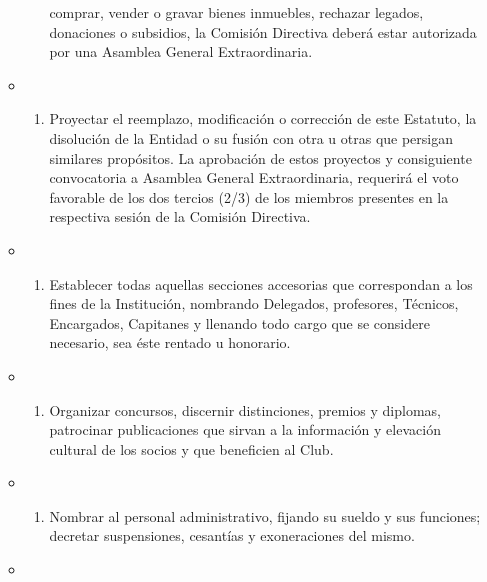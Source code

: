 \documentclass[]{book}
\providecommand{\tightlist}{%
  \setlength{\itemsep}{0pt}\setlength{\parskip}{0pt}}
\begin{document}
\begin{itemize}
\begin{itemize}
\begin{enumerate}
      comprar, vender o gravar bienes inmuebles, rechazar legados,
      donaciones o subsidios, la Comisión Directiva deberá estar
      autorizada por una Asamblea General Extraordinaria.
    \end{enumerate}
  \item
    \begin{enumerate}
    \def\labelenumi{\roman{enumi})}
    \tightlist
    \item
      Proyectar el reemplazo, modificación o corrección de este
      Estatuto, la disolución de la Entidad o su fusión con otra u otras
      que persigan similares propósitos. La aprobación de estos
      proyectos y consiguiente convocatoria a Asamblea General
      Extraordinaria, requerirá el voto favorable de los dos tercios
      (2/3) de los miembros presentes en la respectiva sesión de la
      Comisión Directiva.
    \end{enumerate}
  \item
    \begin{enumerate}
    \def\labelenumi{\alph{enumi})}
    \setcounter{enumi}{9}
    \tightlist
    \item
      Establecer todas aquellas secciones accesorias que correspondan a
      los fines de la Institución, nombrando Delegados, profesores,
      Técnicos, Encargados, Capitanes y llenando todo cargo que se
      considere necesario, sea éste rentado u honorario.
    \end{enumerate}
  \item
    \begin{enumerate}
    \def\labelenumi{\alph{enumi})}
    \setcounter{enumi}{10}
    \tightlist
    \item
      Organizar concursos, discernir distinciones, premios y diplomas,
      patrocinar publicaciones que sirvan a la información y elevación
      cultural de los socios y que beneficien al Club.
    \end{enumerate}
  \item
    \begin{enumerate}
    \def\labelenumi{\alph{enumi})}
    \setcounter{enumi}{11}
    \tightlist
    \item
      Nombrar al personal administrativo, fijando su sueldo y sus
      funciones; decretar suspensiones, cesantías y exoneraciones del
      mismo.
    \end{enumerate}
  \item
    \begin{enumerate}
    \def\labelenumi{\roman{enumi})}
    \setcounter{enumi}{99}

\end{enumerate}
\end{itemize}
\end{itemize}
\end{document}
